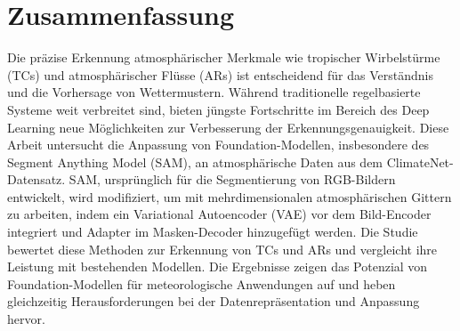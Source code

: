 \documentclass[12pt,final,twoside]{report}
\theoremstyle{plain}
\theoremstyle{definition}
\theoremstyle{remark}
\begin{document}
\vfill
\section*{Zusammenfassung}\label{sec:zusammenfassung}
Die präzise Erkennung atmosphärischer Merkmale wie tropischer Wirbelstürme (TCs) und atmosphärischer Flüsse (ARs) ist entscheidend für das Verständnis und die Vorhersage von Wettermustern. Während traditionelle regelbasierte Systeme weit verbreitet sind, bieten jüngste Fortschritte im Bereich des Deep Learning neue Möglichkeiten zur Verbesserung der Erkennungsgenauigkeit. Diese Arbeit untersucht die Anpassung von Foundation-Modellen, insbesondere des Segment Anything Model (SAM), an atmosphärische Daten aus dem ClimateNet-Datensatz. SAM, ursprünglich für die Segmentierung von RGB-Bildern entwickelt, wird modifiziert, um mit mehrdimensionalen atmosphärischen Gittern zu arbeiten, indem ein Variational Autoencoder (VAE) vor dem Bild-Encoder integriert und Adapter im Masken-Decoder hinzugefügt werden. Die Studie bewertet diese Methoden zur Erkennung von TCs und ARs und vergleicht ihre Leistung mit bestehenden Modellen. Die Ergebnisse zeigen das Potenzial von Foundation-Modellen für meteorologische Anwendungen auf und heben gleichzeitig Herausforderungen bei der Datenrepräsentation und Anpassung hervor.\\


\cleardoublepage

\tableofcontents
\listoffigures
{}
\listoftables

\fancyhead[LE]{\it \leftmark}           %
\fancyhead[RO]{\it \rightmark}          %
\fancyhead[LO,RE]{}                     %
\end{document}
